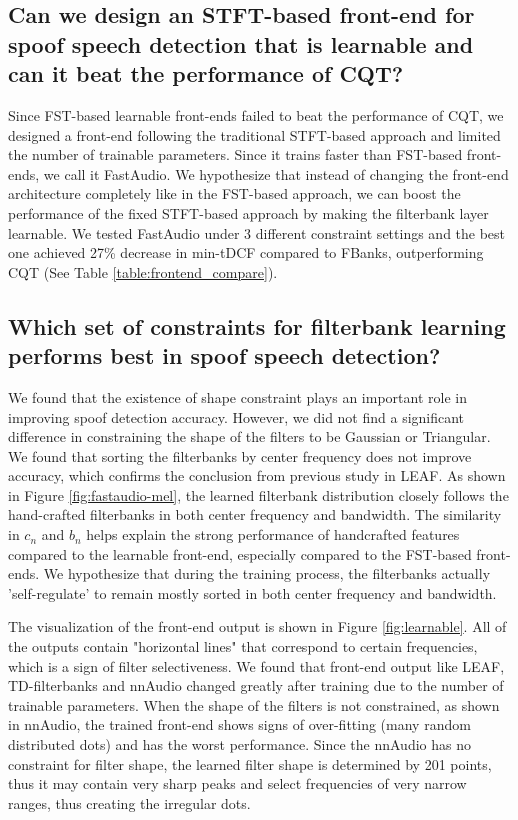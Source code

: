 \documentclass[conference]{IEEEtran}
\begin{document}
\subsection{\label{constraint.subsection}\textbf{Can we design an STFT-based front-end for spoof speech detection that is learnable and can it beat the performance of CQT?} }

Since FST-based learnable front-ends failed to beat the performance of CQT, we designed a front-end following the traditional STFT-based approach and limited the number of trainable parameters. Since it trains faster than FST-based front-ends, we call it FastAudio. We hypothesize that instead of changing the front-end architecture completely like in the FST-based approach, we can boost the performance of the fixed STFT-based approach by making the filterbank layer learnable. We tested FastAudio under 3 different constraint settings and the best one achieved 27\% decrease in min-tDCF compared to FBanks, outperforming CQT (See Table \ref{table:frontend_compare}).

\subsection{\textbf{Which set of constraints for filterbank learning performs best in spoof speech detection?}}

We found that the existence of shape constraint plays an important role in improving spoof detection accuracy. However, we did not find a significant difference in constraining the shape of the filters to be Gaussian or Triangular. We found that sorting the filterbanks by center frequency does not improve accuracy, which confirms the conclusion from previous study in LEAF\cite{Zeghidour2021LEAFAL}. As shown in Figure \ref{fig:fastaudio-mel}, the learned filterbank distribution closely follows the hand-crafted filterbanks in both center frequency and bandwidth. The similarity in $c_n$ and $b_n$ helps explain the strong performance of handcrafted features compared to the learnable front-end, especially compared to the FST-based front-ends. We hypothesize that during the training process, the filterbanks actually 'self-regulate' to remain mostly sorted in both center frequency and bandwidth. 

The visualization of the front-end output is shown in Figure \ref{fig:learnable}. All of the outputs contain "horizontal lines" that correspond to certain frequencies, which is a sign of filter selectiveness. We found that front-end output like LEAF, TD-filterbanks and nnAudio changed greatly after training due to the number of trainable parameters. When the shape of the filters is not constrained, as shown in nnAudio, the trained front-end shows signs of over-fitting (many random distributed dots) and has the worst performance. Since the nnAudio has no constraint for filter shape, the learned filter shape is determined by 201 points, thus it may contain very sharp peaks and select frequencies of very narrow ranges, thus creating the irregular dots.
\end{document}
